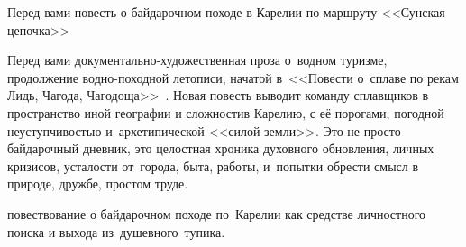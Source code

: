 
\clearpage               %
\thispagestyle{plain}   %


{\small%
\vspace{2mm}
\setlength{\parskip}{2mm}
\setlength{\parindent}{1.0cm}

Перед вами повесть о байдарочном походе в Карелии по маршруту <<Сунская цепочка>>

Перед вами документально-художественная проза о~водном туризме, продолжение водно-походной летописи, начатой в~<<Повести о~сплаве по рекам Лидь, Чагода, Чагодоща>>~\cite{СоболевЛидьЧагодаЧагодоща}. Новая повесть выводит команду сплавщиков в пространство иной географии и сложности\mdash в Карелию, с её порогами, погодной неуступчивостью и~архетипической <<силой земли>>. Это не просто байдарочный дневник, это целостная хроника духовного обновления, личных кризисов, усталости от~города, быта, работы, и~попытки обрести смысл в природе, дружбе, простом труде.

\mdash повествование о байдарочном походе по~Карелии как средстве личностного поиска и выхода из~душевного~тупика.

}
